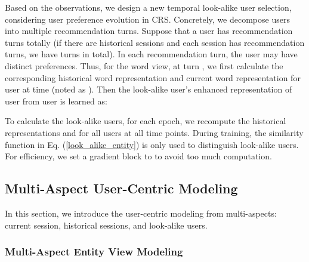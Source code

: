 \documentclass[sigconf,natbib=true]{acmart}
\begin{document}
Based on the observations, we design a new temporal look-alike user selection, considering user preference evolution in CRS. Concretely, we decompose users into multiple recommendation turns. Suppose that a user  has  recommendation turns totally (if there are  historical sessions and each session has  recommendation turns, we have  turns in total). In each recommendation turn, the user may have distinct preferences. Thus, for the word view, at turn , we first calculate the corresponding historical word representation  and current word representation  for user  at time  (noted as ). Then the look-alike user's enhanced representation of user  from user  is learned as:




To calculate the look-alike users, for each epoch, we recompute the historical representations  and  for all users at all time points. During training, the similarity function in Eq. (\ref{look_alike_entity}) is only used to distinguish look-alike users. For efficiency, we set a gradient block to  to avoid too much computation.








\subsection{Multi-Aspect User-Centric Modeling}
\label{sec.u_centric_m}

In this section, we introduce the user-centric modeling from multi-aspects: current session, historical sessions, and look-alike users.


\subsubsection{Multi-Aspect Entity View Modeling}
\label{knowledge_view_learning}


\begin{comment}
The word-level semantic view representation of user  consists of three parts:

where  is all the users from training set, and  denotes the current word representations of user . Next, we introduce the components of  in details.
\end{comment}
\end{document}
